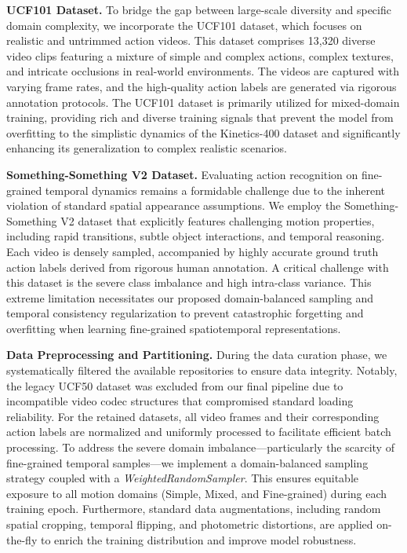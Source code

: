 \documentclass[lettersize,journal]{IEEEtran}
\begin{document}
\textbf{UCF101 Dataset.} To bridge the gap between large-scale diversity and specific domain complexity, we incorporate the UCF101 dataset, which focuses on realistic and untrimmed action videos. This dataset comprises 13,320 diverse video clips featuring a mixture of simple and complex actions, complex textures, and intricate occlusions in real-world environments. The videos are captured with varying frame rates, and the high-quality action labels are generated via rigorous annotation protocols. The UCF101 dataset is primarily utilized for mixed-domain training, providing rich and diverse training signals that prevent the model from overfitting to the simplistic dynamics of the Kinetics-400 dataset and significantly enhancing its generalization to complex realistic scenarios.

\textbf{Something-Something V2 Dataset.} Evaluating action recognition on fine-grained temporal dynamics remains a formidable challenge due to the inherent violation of standard spatial appearance assumptions. We employ the Something-Something V2 dataset that explicitly features challenging motion properties, including rapid transitions, subtle object interactions, and temporal reasoning. Each video is densely sampled, accompanied by highly accurate ground truth action labels derived from rigorous human annotation. A critical challenge with this dataset is the severe class imbalance and high intra-class variance. This extreme limitation necessitates our proposed domain-balanced sampling and temporal consistency regularization to prevent catastrophic forgetting and overfitting when learning fine-grained spatiotemporal representations.

\textbf{Data Preprocessing and Partitioning.} During the data curation phase, we systematically filtered the available repositories to ensure data integrity. Notably, the legacy UCF50 dataset was excluded from our final pipeline due to incompatible video codec structures that compromised standard loading reliability. For the retained datasets, all video frames and their corresponding action labels are normalized and uniformly processed to facilitate efficient batch processing. To address the severe domain imbalance---particularly the scarcity of fine-grained temporal samples---we implement a domain-balanced sampling strategy coupled with a \textit{WeightedRandomSampler}. This ensures equitable exposure to all motion domains (Simple, Mixed, and Fine-grained) during each training epoch. Furthermore, standard data augmentations, including random spatial cropping, temporal flipping, and photometric distortions, are applied on-the-fly to enrich the training distribution and improve model robustness.
\end{document}
